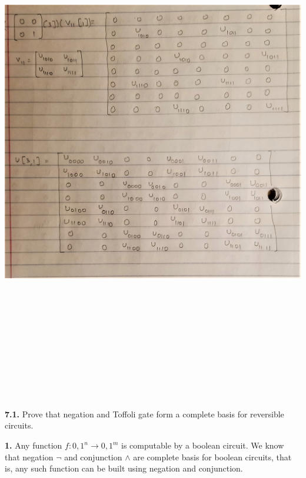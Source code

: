 \documentclass [12pt]{article}
\theoremstyle{definition}
\begin{document}
\includegraphics[width=18cm, height=23cm]{I44}

\newpage

{\bf 7.1.} Prove that negation and Toffoli gate form a complete basis for reversible circuits.

\phantom{1em} {\bf 1.} Any function $f: {0,1}^{n} \rightarrow {0,1}^{m}$ is computable by a boolean circuit. We know that negation $\neg$ and conjunction $\wedge$ are complete basis for boolean circuits, that is, any such function can be built using negation and conjunction.
\end{document}
